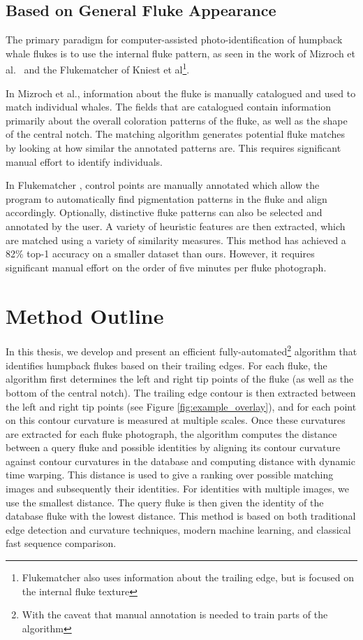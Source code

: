 \subsection{Based on General Fluke Appearance}


The primary paradigm for computer-assisted photo-identification of humpback whale flukes is to use the internal fluke pattern, as seen in the work of Mizroch et al.\ \cite{mizroch1990computer} and the Flukematcher \cite{kniest2010fluke} of Kniest et al\footnote{Flukematcher also uses information about the trailing edge, but is focused on the internal fluke texture}. 

In Mizroch et al., information about the fluke is manually catalogued and used to match individual whales. 
The fields that are catalogued contain information primarily about the overall coloration patterns of the fluke, as well as the shape of the central notch. 
The matching algorithm generates potential fluke matches by looking at how similar the annotated patterns are.
This requires significant manual effort to identify individuals.

In Flukematcher \cite{kniest2010fluke}, control points are manually annotated which allow the program to automatically find pigmentation patterns in the fluke and align accordingly.
Optionally, distinctive fluke patterns can also be selected and annotated by the user.
A variety of heuristic features are then extracted, which are matched using a variety of similarity measures.
This method has achieved a 82\% top-1 accuracy on a smaller dataset than ours.
However, it requires significant manual effort on the order of five minutes per fluke photograph.

\section{Method Outline}


In this thesis, we develop and present an efficient fully-automated\footnote{With the caveat that manual annotation is needed to train parts of the algorithm} algorithm that identifies humpback flukes based on their trailing edges.
For each fluke, the algorithm first determines the left and right tip points of the fluke (as well as the bottom of the central notch). 
The trailing edge contour is then extracted between the left and right tip points (see Figure \ref{fig:example_overlay}), and for each point on this contour curvature is measured at multiple scales.
Once these curvatures are extracted for each fluke photograph, the algorithm computes the distance between a query fluke and possible identities by aligning its contour curvature against contour curvatures in the database and computing distance with dynamic time warping.
This distance is used to give a ranking over possible matching images and subsequently their identities.  
For identities with multiple images, we use the smallest distance.
The query fluke is then given the identity of the database fluke with the lowest distance.
This method is based on both traditional edge detection and curvature techniques, modern machine learning, and classical fast sequence comparison.

